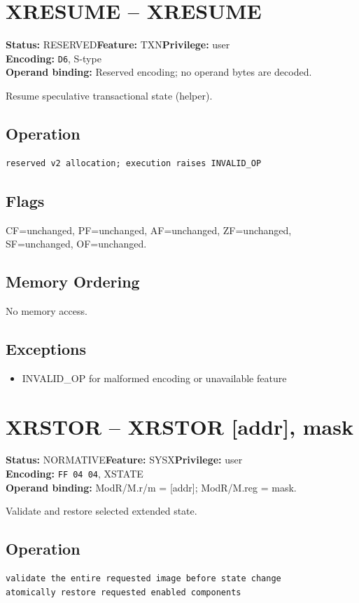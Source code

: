 \documentclass[10pt]{article}
\begin{document}
\section{XRESUME -- XRESUME}
\textbf{Status:} RESERVED\quad \textbf{Feature:} TXN\quad \textbf{Privilege:} user\\
\textbf{Encoding:} \texttt{D6}, S-type\\
\textbf{Operand binding:} Reserved encoding; no operand bytes are decoded.

Resume speculative transactional state (helper).

\subsection*{Operation}
\begin{lstlisting}
reserved v2 allocation; execution raises INVALID_OP
\end{lstlisting}
\subsection*{Flags}
CF=unchanged, PF=unchanged, AF=unchanged, ZF=unchanged, SF=unchanged, OF=unchanged.
\subsection*{Memory Ordering}
No memory access.
\subsection*{Exceptions}
\begin{itemize}
\item INVALID\_OP for malformed encoding or unavailable feature
\end{itemize}
\clearpage

\section{XRSTOR -- XRSTOR [addr], mask}
\textbf{Status:} NORMATIVE\quad \textbf{Feature:} SYSX\quad \textbf{Privilege:} user\\
\textbf{Encoding:} \texttt{FF 04 04}, XSTATE\\
\textbf{Operand binding:} ModR/M.r/m = [addr]; ModR/M.reg = mask.

Validate and restore selected extended state.

\subsection*{Operation}
\begin{lstlisting}
validate the entire requested image before state change
atomically restore requested enabled components
\end{lstlisting}
\end{document}
